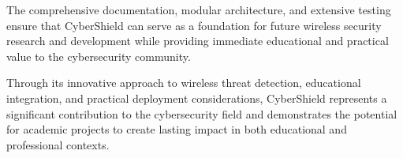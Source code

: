 \documentclass[12pt,a4paper]{report}
\begin{document}
The comprehensive documentation, modular architecture, and extensive testing ensure that CyberShield can serve as a foundation for future wireless security research and development while providing immediate educational and practical value to the cybersecurity community.

Through its innovative approach to wireless threat detection, educational integration, and practical deployment considerations, CyberShield represents a significant contribution to the cybersecurity field and demonstrates the potential for academic projects to create lasting impact in both educational and professional contexts.

\end{document}
